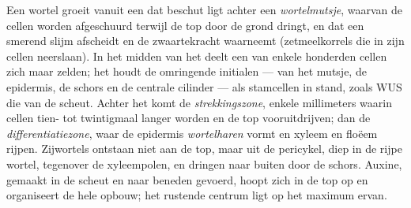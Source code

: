 \begin{proposition}[De worteltop]\label{prop:b2:plant-meristems:ram}
Een wortel groeit vanuit een  dat beschut ligt achter een
\emph{wortelmutsje}, waarvan de cellen worden afgeschuurd terwijl de top
door de grond dringt, en dat een smerend slijm afscheidt en de
zwaartekracht waarneemt (zetmeelkorrels die in zijn cellen neerslaan). In
het midden van het  deelt een \emph{} van enkele
honderden cellen zich maar zelden; het houdt de omringende initialen --- van
het mutsje, de epidermis, de schors en de centrale cilinder --- als
stamcellen in stand, zoals WUS die van de scheut. Achter het  komt
de \emph{strekkingszone}, enkele millimeters waarin cellen tien- tot
twintigmaal langer worden en de top vooruitdrijven; dan de
\emph{differentiatiezone}, waar de epidermis \emph{wortelharen} vormt en
xyleem en floëem rijpen. Zijwortels ontstaan niet aan de top, maar uit de
pericykel, diep in de rijpe wortel, tegenover de xyleempolen, en dringen
naar buiten door de schors. Auxine, gemaakt in de scheut en naar beneden
gevoerd, hoopt zich in de top op en organiseert de hele opbouw; het
rustende centrum ligt op het maximum ervan.
\end{proposition}

